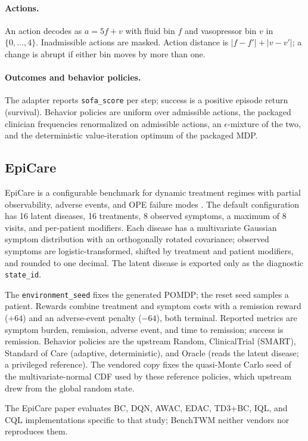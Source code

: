 \documentclass[10pt,twocolumn]{article}
\newcommand{\code}[1]{\texttt{#1}}
\begin{document}
\paragraph{Actions.} An action decodes as $a=5f+v$ with fluid bin $f$ and vasopressor bin $v$ in $\{0,\ldots,4\}$. Inadmissible actions are masked. Action distance is $|f-f'|+|v-v'|$; a change is abrupt if either bin moves by more than one.

\paragraph{Outcomes and behavior policies.} The adapter reports \code{sofa\_score} per step; success is a positive episode return (survival). Behavior policies are uniform over admissible actions, the packaged clinician frequencies renormalized on admissible actions, an $\epsilon$-mixture of the two, and the deterministic value-iteration optimum of the packaged MDP.

\subsection{EpiCare}
\label{sec:epicare}

EpiCare is a configurable benchmark for dynamic treatment regimes with partial observability, adverse events, and OPE failure modes \cite{hargrave2024epicare}. The default configuration has 16 latent diseases, 16 treatments, 8 observed symptoms, a maximum of 8 visits, and per-patient modifiers. Each disease has a multivariate Gaussian symptom distribution with an orthogonally rotated covariance; observed symptoms are logistic-transformed, shifted by treatment and patient modifiers, and rounded to one decimal. The latent disease is exported only as the diagnostic \code{state\_id}.

The \code{environment\_seed} fixes the generated POMDP; the reset seed samples a patient. Rewards combine treatment and symptom costs with a remission reward ($+64$) and an adverse-event penalty ($-64$), both terminal. Reported metrics are symptom burden, remission, adverse event, and time to remission; success is remission. Behavior policies are the upstream Random, ClinicalTrial (SMART), Standard of Care (adaptive, deterministic), and Oracle (reads the latent disease; a privileged reference). The vendored copy fixes the quasi-Monte Carlo seed of the multivariate-normal CDF used by these reference policies, which upstream drew from the global random state.

The EpiCare paper evaluates BC, DQN, AWAC, EDAC, TD3+BC, IQL, and CQL implementations specific to that study; BenchTWM neither vendors nor reproduces them.
\end{document}
